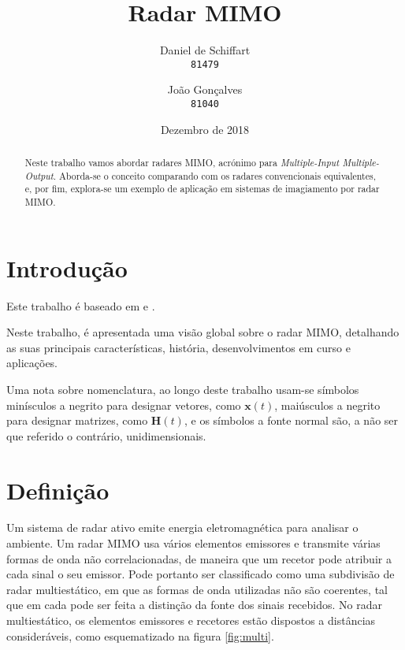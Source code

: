 \documentclass[purist,portuguese]{ist-report}
\author{Daniel de Schiffart \\ \texttt{81479} \and João Gonçalves \\ \texttt{81040}}
\title{Radar MIMO}
\subtitle{}
\date{Dezembro de 2018}
\begin{document}
\makecover


{ \tableofcontents}

\newpage

\begin{abstract}
  Neste trabalho vamos abordar radares MIMO, acrónimo para \textit{Multiple-Input Multiple-Output}. Aborda-se o conceito comparando com os radares convencionais equivalentes, e, por fim, explora-se um exemplo de aplicação em sistemas de imagiamento por radar MIMO.
\end{abstract}

\section{Introdução}

Este trabalho é baseado em \cite{davis2015mimo} e \cite{li2018mimo}.

Neste trabalho, é apresentada uma visão global sobre o radar MIMO, detalhando as suas principais características, história, desenvolvimentos em curso e aplicações.

Uma nota sobre nomenclatura, ao longo deste trabalho usam-se símbolos minísculos a negrito para designar vetores, como $\mathbf{x}(t)$, maiúsculos a negrito para designar matrizes, como $\mathbf{H}(t)$, e os símbolos a fonte normal são, a não ser que referido o contrário, unidimensionais.

\section{Definição}

Um sistema de radar ativo emite energia eletromagnética para analisar o ambiente.
Um radar MIMO usa vários elementos emissores e transmite várias formas de onda não correlacionadas, de maneira que um recetor pode atribuir a cada sinal o seu emissor. 
Pode portanto ser classificado como uma subdivisão de radar multiestático, em que as formas de onda utilizadas não são coerentes, tal que em cada pode ser feita a distinção da fonte dos sinais recebidos.
No radar multiestático, os elementos emissores e recetores estão dispostos a distâncias consideráveis, como esquematizado na figura \ref{fig:multi}.
\end{document}
